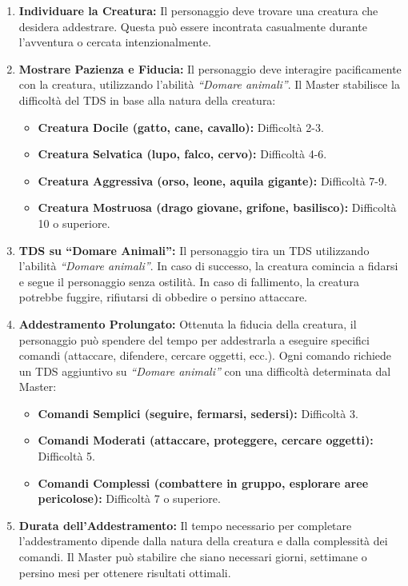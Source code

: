 \documentclass[../manuale_main.tex]{subfiles}
\begin{document}
\begin{enumerate}
    \item \textbf{Individuare la Creatura:} Il personaggio deve trovare una creatura che desidera addestrare. Questa può essere incontrata casualmente durante l'avventura o cercata intenzionalmente.
    
    \item \textbf{Mostrare Pazienza e Fiducia:} Il personaggio deve interagire pacificamente con la creatura, utilizzando l'abilità \emph{``Domare animali''}. Il Master stabilisce la difficoltà del TDS in base alla natura della creatura:
    \begin{itemize}
        \item \textbf{Creatura Docile (gatto, cane, cavallo):} Difficoltà 2-3.
        \item \textbf{Creatura Selvatica (lupo, falco, cervo):} Difficoltà 4-6.
        \item \textbf{Creatura Aggressiva (orso, leone, aquila gigante):} Difficoltà 7-9.
        \item \textbf{Creatura Mostruosa (drago giovane, grifone, basilisco):} Difficoltà 10 o superiore.
    \end{itemize}
    
    \item \textbf{TDS su ``Domare Animali'':} Il personaggio tira un TDS utilizzando l'abilità \emph{``Domare animali''}. In caso di successo, la creatura comincia a fidarsi e segue il personaggio senza ostilità. In caso di fallimento, la creatura potrebbe fuggire, rifiutarsi di obbedire o persino attaccare.
    
    \item \textbf{Addestramento Prolungato:} Ottenuta la fiducia della creatura, il personaggio può spendere del tempo per addestrarla a eseguire specifici comandi (attaccare, difendere, cercare oggetti, ecc.). Ogni comando richiede un TDS aggiuntivo su \emph{``Domare animali''} con una difficoltà determinata dal Master:
    \begin{itemize}
        \item \textbf{Comandi Semplici (seguire, fermarsi, sedersi):} Difficoltà 3.
        \item \textbf{Comandi Moderati (attaccare, proteggere, cercare oggetti):} Difficoltà 5.
        \item \textbf{Comandi Complessi (combattere in gruppo, esplorare aree pericolose):} Difficoltà 7 o superiore.
    \end{itemize}
    
    \item \textbf{Durata dell'Addestramento:} Il tempo necessario per completare l'addestramento dipende dalla natura della creatura e dalla complessità dei comandi. Il Master può stabilire che siano necessari giorni, settimane o persino mesi per ottenere risultati ottimali.
\end{enumerate}
\end{document}

